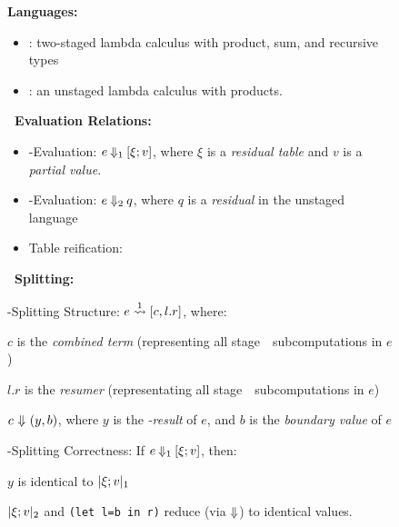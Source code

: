 \begin{figure}
\textbf{Languages:}
\begin{itemize}
\item \lang: two-staged lambda calculus with product, sum, and
  recursive types
\item \langmono: an unstaged lambda calculus with products.
\end{itemize}

\textbf{\lang\ Evaluation Relations:}
\begin{itemize}
\item 
\bbone-Evaluation: $e\mathbin{{\Downarrow_{ 1}}}[\xi;v]$, where $\xi$ is a \emph{residual table} and $v$ is a \emph{partial value}. 

\item
\bbtwo-Evaluation: $e\mathbin{{\Downarrow_{ 2}}}q$, where $q$ is a \emph{residual} in the unstaged language \langTwo

\item 
Table reification: 
\end{itemize}




\vspace{.75em}
\textbf{\lang\ Splitting:}

\hspace{2em}\bbone-Splitting Structure: $e \overset{ 1}\rightsquigarrow [c,l.r]$, where:

\hspace{4em}$c$ is the \emph{combined term} (representing all stage~\bbone\ subcomputations in $e$)

\hspace{4em}$l.r$ is the \emph{resumer} (representating all stage~\bbtwo\ subcomputations in $e$)

\hspace{4em}$c~{\Downarrow}~(y,b)$, where $y$ is the \emph{\bbone-result} of $e$, and $b$ is the \emph{boundary value} of $e$

 
\hspace{2em}\bbone-Splitting Correctness: If $e\mathbin{{\Downarrow_{ 1}}}[\xi;v]$, then:

\hspace{4em}$y$ is identical to $|\xi;v|_{ 1}$

\hspace{4em}$|\xi;v|_{ 2}$ and \texttt{(let l=b in r)} reduce (via ${\Downarrow}$) to identical values.  


\end{figure}
